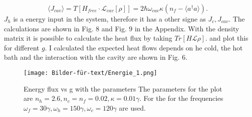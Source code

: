 \documentclass[12pt,a4paper]{article}
\begin{document}
\begin{equation}
\langle J_{cav}\rangle=T[H_{free}\cdot \mathcal{L}_{cav}[\rho]]=2\hbar \omega_{cav}\kappa (n_f-\langle a^{\dag{}}a \rangle).\label{c}
\end{equation}
$J_h$ is a energy input in the system, therefore it has a other signe as $J_c, J_{cav}$.
The calculations are shown in Fig. 8 and Fig. 9 in the Appendix.
With the density matrix it is possible to calculate the heat flux by taking $Tr[H \mathcal{L}\rho]$. 
and plot this for different  $g$. 
 I calculated the expected heat flows depends on he cold, the hot bath and the interaction with the cavity are shown in Fig.  6.

\begin{figure}[hbtp]
\centering
\texttt{[image: Bilder-für-text/Energie\_1.png]}
\caption{Energy flux vs g with the parameters The parameters for the plot are $ n_h=2.6, n_c= n_f=0.02,\kappa=0.01\gamma $.  For the for the frequencies $\omega_f=30\gamma,\omega_h=150\gamma, \omega_c=120\gamma$ are used. }
\end{figure}
\end{document}
